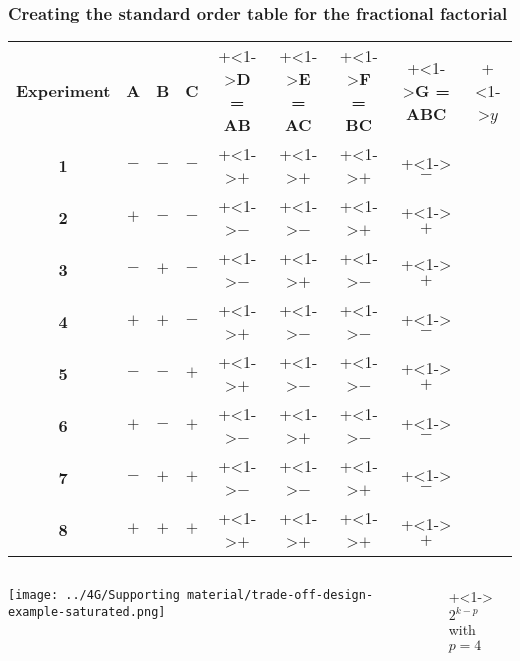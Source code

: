 \begin{frame}\frametitle{Creating the standard order table for the fractional factorial}
	\vspace{0.4cm}
	\begin{tabulary}{\linewidth}{c|ccccccc|c}
		\textbf{\relax Experiment} & \textbf{\relax A } & \textbf{\relax B} & \textbf{\relax C } & \onslide+<1->{\textbf{\relax D = AB}} & \onslide+<1->{\textbf{\relax E = AC}} & \onslide+<1->{\textbf{\relax F = BC}} & \onslide+<1->{\textbf{\relax G = ABC}} & \onslide+<1->{$y$}\\ 
		\textbf{1} & \(-\) & \(-\) & \(-\) & \onslide+<1->{\(+\)} & \onslide+<1->{\(+\)} & \onslide+<1->{\(+\)} & \onslide+<1->{\(-\)} \\
		\textbf{2} & \(+\) & \(-\) & \(-\) & \onslide+<1->{\(-\)} & \onslide+<1->{\(-\)} & \onslide+<1->{\(+\)} & \onslide+<1->{\(+\)} \\
		\textbf{3} & \(-\) & \(+\) & \(-\) & \onslide+<1->{\(-\)} & \onslide+<1->{\(+\)} & \onslide+<1->{\(-\)} & \onslide+<1->{\(+\)} \\
		\textbf{4} & \(+\) & \(+\) & \(-\) & \onslide+<1->{\(+\)} & \onslide+<1->{\(-\)} & \onslide+<1->{\(-\)} & \onslide+<1->{\(-\)} \\
		\textbf{5} & \(-\) & \(-\) & \(+\) & \onslide+<1->{\(+\)} & \onslide+<1->{\(-\)} & \onslide+<1->{\(-\)} & \onslide+<1->{\(+\)} \\
		\textbf{6} & \(+\) & \(-\) & \(+\) & \onslide+<1->{\(-\)} & \onslide+<1->{\(+\)} & \onslide+<1->{\(-\)} & \onslide+<1->{\(-\)} \\
		\textbf{7} & \(-\) & \(+\) & \(+\) & \onslide+<1->{\(-\)} & \onslide+<1->{\(-\)} & \onslide+<1->{\(+\)} & \onslide+<1->{\(-\)} \\
		\textbf{8} & \(+\) & \(+\) & \(+\) & \onslide+<1->{\(+\)} & \onslide+<1->{\(+\)} & \onslide+<1->{\(+\)} & \onslide+<1->{\(+\)} \\ 
	\end{tabulary}
	
	\vspace{0.4cm}
	
	
	\begin{columns}[T]
		
			\centerline{\texttt{[image: ../4G/Supporting material/trade-off-design-example-saturated.png]}}
		
			\onslide+<1->{
				{\huge $2^{k-p}$\\
				{\normalsize with} $p=4$}
			}
	\end{columns}
\end{frame}


